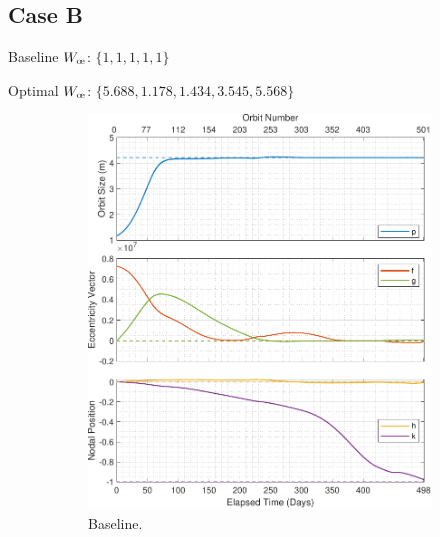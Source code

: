 \newpage
\subsection{Case B}
\label{sec:gso_case_plot}
Baseline \(W_{\moe}\): \(\{1, 1, 1, 1, 1\}\)

Optimal \(W_{\moe}\): \(\{5.688, 1.178, 1.434, 3.545, 5.568\}\)

\begin{figure}[H]
    \centering
    \begin{subfigure}[t]{0.49\textwidth}
        \includegraphics[width=\textwidth]{figures/oguri_G/orbital_elements.pdf}
        \caption{Baseline.}
        \label{fig:results_optim_b_1}
    \end{subfigure}
    \begin{subfigure}[t]{0.49\textwidth}

\end{subfigure}
\end{figure}
